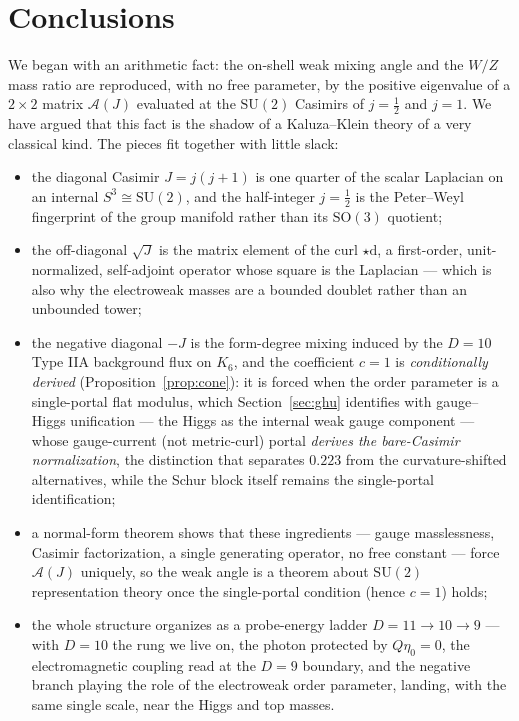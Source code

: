 \documentclass[11pt]{article}
\theoremstyle{plain}
\theoremstyle{definition}
\newcommand{\cA}{\mathcal{A}}
\newcommand{\half}{\tfrac12}
\newcommand{\dd}{\mathrm{d}}
\newcommand{\SU}{\mathrm{SU}}
\newcommand{\SO}{\mathrm{SO}}
\begin{document}
\section{Conclusions}
\label{sec:conclusion}

We began with an arithmetic fact: the on-shell weak mixing angle and the
$W/Z$ mass ratio are reproduced, with no free parameter, by the positive
eigenvalue of a $2\times2$ matrix $\cA(J)$ evaluated at the $\SU(2)$
Casimirs of $j=\half$ and $j=1$. We have argued that this fact is the
shadow of a Kaluza--Klein theory of a very classical kind. The pieces fit
together with little slack:
\begin{itemize}
\item the diagonal Casimir $J=j(j+1)$ is one quarter of the scalar
Laplacian on an internal $S^3\cong\SU(2)$, and the half-integer $j=\half$ is
the Peter--Weyl fingerprint of the group manifold rather than its $\SO(3)$
quotient;
\item the off-diagonal $\sqrt J$ is the matrix element of the curl
$\star\dd$, a first-order, unit-normalized, self-adjoint operator whose
square is the Laplacian --- which is also why the electroweak masses are a
bounded doublet rather than an unbounded tower;
\item the negative diagonal $-J$ is the form-degree mixing induced by the
$D=10$ Type IIA background flux on $K_6$, and the coefficient $c=1$ is
\emph{conditionally derived} (Proposition~\ref{prop:cone}): it is forced when
the order parameter is a single-portal flat modulus, which
Section~\ref{sec:ghu} identifies with gauge--Higgs unification --- the Higgs
as the internal weak gauge component --- whose gauge-current (not metric-curl)
portal \emph{derives the bare-Casimir normalization}, the distinction that
separates $0.223$ from the curvature-shifted alternatives, while the Schur
block itself remains the single-portal identification;
\item a normal-form theorem shows that these ingredients --- gauge
masslessness, Casimir factorization, a single generating operator, no free
constant --- force $\cA(J)$ uniquely, so the weak angle is a theorem about
$\SU(2)$ representation theory once the single-portal condition (hence $c=1$)
holds;
\item the whole structure organizes as a probe-energy ladder
$D=11\to10\to9$ --- with $D=10$ the rung we live on, the photon protected by
$Q\eta_0=0$, the electromagnetic coupling read at the $D=9$ boundary, and the
negative branch playing the role of the electroweak order parameter, landing,
with the same single scale, near the Higgs and top masses.
\end{itemize}
\end{document}
